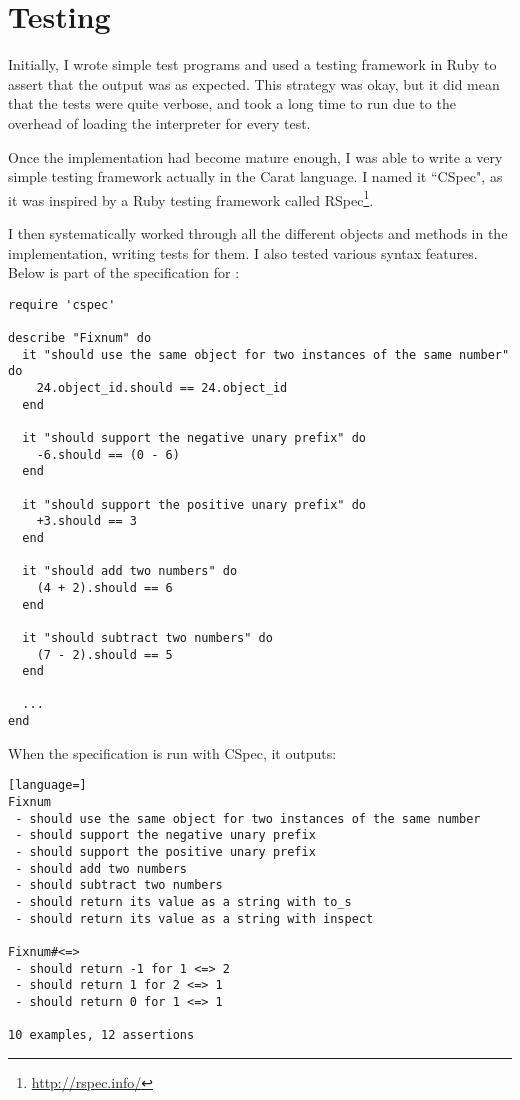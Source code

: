 \section{Testing}

Initially, I wrote simple test programs and used a testing framework in Ruby to assert that the output was as expected. This strategy was okay, but it did mean that the tests were quite verbose, and took a long time to run due to the overhead of loading the interpreter for every test.

Once the implementation had become mature enough, I was able to write a very simple testing framework actually in the Carat language. I named it ``CSpec", as it was inspired by a Ruby testing framework called RSpec\footnote{\url{http://rspec.info/}}.

I then systematically worked through all the different objects and methods in the implementation, writing tests for them. I also tested various syntax features. Below is part of the specification for :

\begin{lstlisting}
require 'cspec'

describe "Fixnum" do
  it "should use the same object for two instances of the same number" do
    24.object_id.should == 24.object_id
  end
  
  it "should support the negative unary prefix" do
    -6.should == (0 - 6)
  end
  
  it "should support the positive unary prefix" do
    +3.should == 3
  end
  
  it "should add two numbers" do
    (4 + 2).should == 6
  end
  
  it "should subtract two numbers" do
    (7 - 2).should == 5
  end
  
  ...
end
\end{lstlisting}

When the  specification is run with CSpec, it outputs:

\begin{minipage}{\textwidth}
\begin{lstlisting}[language=]
Fixnum
 - should use the same object for two instances of the same number
 - should support the negative unary prefix
 - should support the positive unary prefix
 - should add two numbers
 - should subtract two numbers
 - should return its value as a string with to_s
 - should return its value as a string with inspect

Fixnum#<=>
 - should return -1 for 1 <=> 2
 - should return 1 for 2 <=> 1
 - should return 0 for 1 <=> 1

10 examples, 12 assertions
\end{lstlisting}
\end{minipage}

